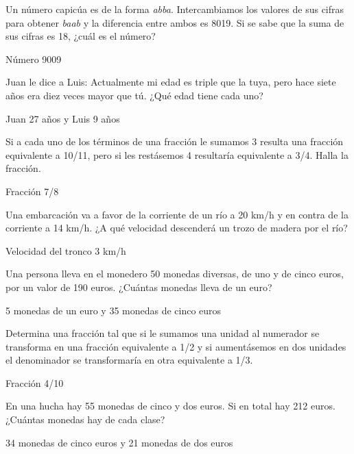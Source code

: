 \documentclass[spanish, 12pt]{exam}
\begin{document}
\begin{questions}
\question Un número capicúa es de la forma \emph{abba}. Intercambiamos los valores de sus cifras para obtener \emph{baab} y la diferencia entre ambos es 8019. Si se sabe que la suma de sus cifras es 18, ¿cuál es el número?
\begin{solution} Número 9009 \end{solution}

\question Juan le dice a Luis: Actualmente mi edad es triple que la tuya, pero hace siete años era diez veces mayor que tú. ¿Qué edad tiene cada uno?

\begin{solution} Juan 27 años y Luis 9 años \end{solution}

\question Si a cada uno de los términos de una fracción le sumamos 3 resulta una fracción equivalente a 10/11, pero si les restásemos 4 resultaría equivalente a 3/4. Halla la fracción.
\begin{solution} Fracción 7/8 \end{solution}

\question Una embarcación va a favor de la corriente de un río a 20 km/h y en contra de la corriente a 14 km/h. ¿A qué velocidad descenderá un trozo de madera por el río?

\begin{solution} Velocidad del tronco 3 km/h \end{solution}

\question Una persona lleva en el monedero 50 monedas diversas, de uno y de cinco euros, por un valor de 190 euros. ¿Cuántas monedas lleva de un euro?
\begin{solution} 5 monedas de un euro y 35 monedas de cinco euros \end{solution}

\question Determina una fracción tal que si le sumamos una unidad al numerador se transforma en una fracción equivalente a 1/2 y si aumentásemos en dos unidades el denominador se transformaría en otra equivalente a 1/3.

\begin{solution} Fracción 4/10 \end{solution}

\question En una hucha hay 55 monedas de cinco y dos euros. Si en total hay 212 euros. ¿Cuántas monedas hay de cada clase?
\begin{solution} 34 monedas de cinco euros y 21 monedas de dos euros \end{solution}


\end{questions}
\end{document}
